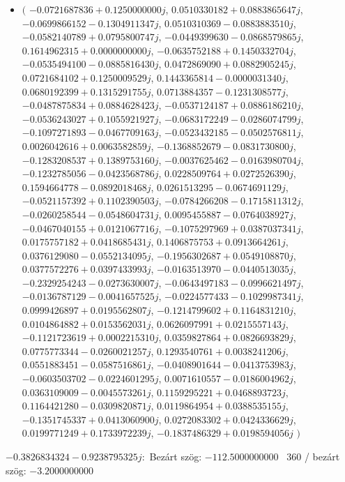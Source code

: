 \documentclass[14pt,a4paper]{article}
\begin{document}
\begin{itemize}
\item
$\big($
$-0.0721687836+0.1250000000j$, $0.0510330182+0.0883865647j$, $-0.0699866152-0.1304911347j$, $0.0510310369-0.0883883510j$, $-0.0582140789+0.0795800747j$, $-0.0449399630-0.0868579865j$, $0.1614962315+0.0000000000j$, $-0.0635752188+0.1450332704j$, $-0.0535494100-0.0885816430j$, $0.0472869090+0.0882905245j$, $0.0721684102+0.1250009529j$, $0.1443365814-0.0000031340j$, $0.0680192399+0.1315291755j$, $0.0713884357-0.1231308577j$, $-0.0487875834+0.0884628423j$, $-0.0537124187+0.0886186210j$, $-0.0536243027+0.1055921927j$, $-0.0683172249-0.0286074799j$, $-0.1097271893-0.0467709163j$, $-0.0523432185-0.0502576811j$, $0.0026042616+0.0063582859j$, $-0.1368852679-0.0831730800j$, $-0.1283208537+0.1389753160j$, $-0.0037625462-0.0163980704j$, $-0.1232785056-0.0423568786j$, $0.0228509764+0.0272526390j$, $0.1594664778-0.0892018468j$, $0.0261513295-0.0674691129j$, $-0.0521157392+0.1102390503j$, $-0.0784266208-0.1715811312j$, $-0.0260258544-0.0548604731j$, $0.0095455887-0.0764038927j$, $-0.0467040155+0.0121067716j$, $-0.1075297969+0.0387037341j$, $0.0175757182+0.0418685431j$, $0.1406875753+0.0913664261j$, $0.0376129080-0.0552134095j$, $-0.1956302687+0.0549108870j$, $0.0377572276+0.0397433993j$, $-0.0163513970-0.0440513035j$, $-0.2329254243-0.0273630007j$, $-0.0643497183-0.0996621497j$, $-0.0136787129-0.0041657525j$, $-0.0224577433-0.1029987341j$, $0.0999426897+0.0195562807j$, $-0.1214799602+0.1164831210j$, $0.0104864882+0.0153562031j$, $0.0626097991+0.0215557143j$, $-0.1121723619+0.0002215310j$, $0.0359827864+0.0826693829j$, $0.0775773344-0.0260021257j$, $0.1293540761+0.0038241206j$, $0.0551883451-0.0587516861j$, $-0.0408901644-0.0413753983j$, $-0.0603503702-0.0224601295j$, $0.0071610557-0.0186004962j$, $0.0363109009-0.0045573261j$, $0.1159295221+0.0468893723j$, $0.1164421280-0.0309820871j$, $0.0119864954+0.0388535155j$, $-0.1351745337+0.0413060900j$, $0.0272083302+0.0424336629j$, $0.0199771249+0.1733972239j$, $-0.1837486329+0.0198594056j$
$\big)$
\end{itemize}
$-0.3826834324-0.9238795325j$:\
Bezárt szög: $-112.5000000000$ \
360 / bezárt szög: $-3.2000000000$\
\end{document}
